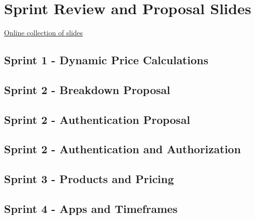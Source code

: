 
\chapter{Sprint Review and Proposal Slides}
\label{appendix:slides}

\href{https://goo.gl/BR75HN}{Online collection of slides}

\section{Sprint 1 - Dynamic Price Calculations}
\label{appendix:slides_1}


\section{Sprint 2 - Breakdown Proposal}
\label{appendix:slides_2_breakdown}


\section{Sprint 2 - Authentication Proposal}
\label{appendix:slides_2_authentication}


\section{Sprint 2 - Authentication and Authorization}
\label{appendix:slides_2}


\section{Sprint 3 - Products and Pricing}
\label{appendix:slides_3}


\section{Sprint 4 - Apps and Timeframes}
\label{appendix:slides_4}


